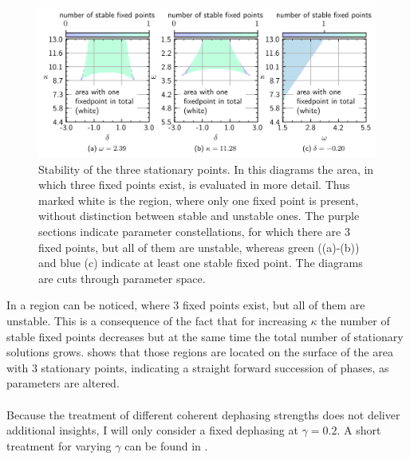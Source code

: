 \begin{figure}[H]
    \vspace*{-0.3cm}
    \includegraphics{pictures/numb_of_fixp_stabcuts2.png}
    \caption{Stability of the three stationary points. In this diagrams the area, in which three fixed points exist, is evaluated in more detail. Thus marked white is the region, where only one fixed point is present, without distinction between stable and unstable ones. The purple sections indicate parameter constellations, for which there are 3 fixed points, but all of them are unstable, whereas green ((a)-(b)) and blue (c) indicate at least one stable fixed point. The diagrams are cuts through parameter space.}
    \label{fig:stability_cuts}
\end{figure}
In  a region can be noticed, where 3 fixed points exist, but all of them are unstable. This is a consequence of the fact that for increasing $\kappa$ the number of stable fixed points decreases but at the same time the total number of stationary solutions grows.  shows that those regions are located on the surface of the area with 3 stationary points, indicating a straight forward succession of phases, as parameters are altered.\\\\
Because the treatment of different coherent dephasing strengths does not deliver additional insights, I will only consider a fixed dephasing at $\gamma=0.2$. A short treatment for varying $\gamma$ can be found in .
